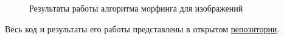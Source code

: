 \documentclass[oneside,final,14pt]{extreport}
\begin{document}
\begin{figure}[ht]
    \endminipage\hfill
    \endminipage\hfill
    \caption{Результаты работы алгоритма морфинга для изображений}
    \label{morf:dance}
\end{figure}

Весь код и результаты его работы представлены в открытом \href{https://github.com/morozov6420/morphing}{репозитории}.
\end{document}
